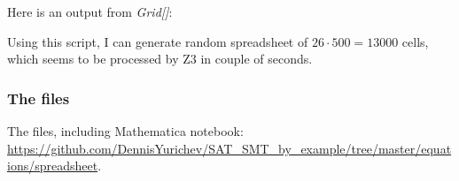 

Here is an output from \textit{Grid[]}:



Using this script, I can generate random spreadsheet of $26 \cdot 500=13000$ cells,
which seems to be processed by Z3 in couple of seconds.

\subsubsection{The files}

The files, including Mathematica notebook: \url{https://github.com/DennisYurichev/SAT_SMT_by_example/tree/master/equations/spreadsheet}.

